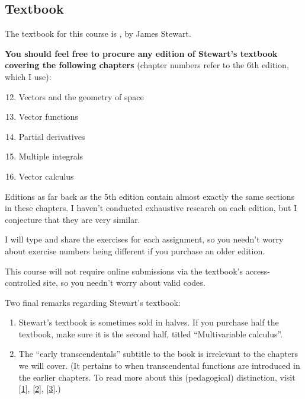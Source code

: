 \subsection{Textbook}

The textbook for this course is , by James Stewart.

\textbf{You should feel free to procure any edition of Stewart's textbook covering the following chapters} (chapter numbers refer to the 6th edition, which I use):
\begin{multicols}{2}
\begin{enumerate}
\setcounter{enumi}{11}
\item Vectors and the geometry of space
\item Vector functions
\item Partial derivatives
\item Multiple integrals
\item Vector calculus
\end{enumerate}
\end{multicols}
Editions as far back as the 5th edition contain almost exactly the same sections in these chapters. I haven't conducted exhaustive research on each edition, but I conjecture that they are very similar.

I will type and share the exercises for each assignment, so you needn't worry about exercise numbers being different if you purchase an older edition.

This course will not require online submissions via the textbook's access-controlled site, so you needn't worry about valid codes.

Two final remarks regarding Stewart's textbook:
\begin{enumerate}
\item Stewart's textbook is sometimes sold in halves. If you purchase half the textbook, make sure it is the second half, titled ``Multivariable calculus''.
\item The ``early transcendentals'' subtitle to the book is irrelevant to the chapters we will cover. (It pertains to when transcendental functions are introduced in the earlier chapters. To read more about this (pedagogical) distinction, visit [\href{http://math.stackexchange.com/questions/535283/whats-the-difference-between-early-transcendentals-and-late-transcendentals}{1}], [\href{https://answers.yahoo.com/question/index?qid=20070730231738AAixrGh}{2}], [\href{https://www.reddit.com/r/learnmath/comments/2ww1ab/intro_calculus_what_is_the_difference_between/}{3}].)
\end{enumerate}





